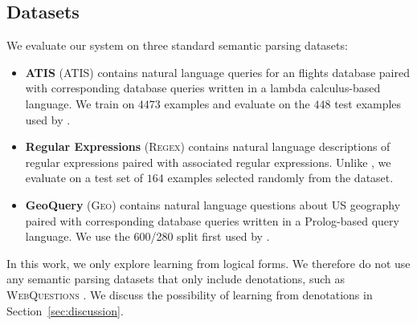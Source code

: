 \documentclass[11pt,letterpaper]{article}
\newcommand{\atis}{\textsc{ATIS}\xspace}
\newcommand{\regex}{\textsc{Regex}\xspace}
\newcommand{\geo}{\textsc{Geo}\xspace}
\begin{document}
\subsection{Datasets}

We evaluate our system on three standard semantic parsing datasets:
\begin{itemize}
  \item \textbf{ATIS} (\atis) contains 
    natural language queries for an flights database
    paired with corresponding database queries written in a 
    lambda calculus-based language.  
    We train on $4473$ examples and evaluate on the $448$
    test examples used by 
    .

  \item \textbf{Regular Expressions} (\regex)
  contains natural language descriptions of regular expressions
  paired with associated regular expressions.
  Unlike , 
  we evaluate
  on a test set of $164$ examples selected randomly
  from the dataset.

  \item \textbf{GeoQuery} (\geo) contains
  natural language questions about US geography
  paired with corresponding database queries written in a Prolog-based
  query language.
  We use the 600/280 split first used by
  .
\end{itemize}


In this work, we only explore learning from logical forms.
We therefore do not use any semantic parsing datasets
that only include denotations,
such as \textsc{WebQuestions} \cite{berant2013freebase}.
We discuss the possibility of learning from denotations
in Section~\ref{sec:discussion}.
\end{document}
